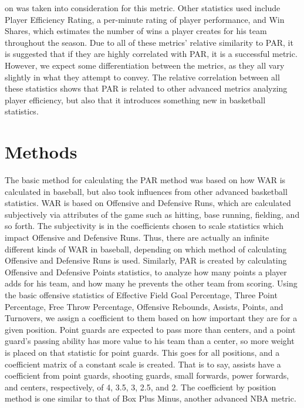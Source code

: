 \documentclass[12pt]{article}
\begin{document}
on was taken into consideration for this metric. Other statistics used include Player Efficiency Rating, a 
per-minute 
rating of player performance, and Win Shares, which estimates the number of wins a player creates 
for his team throughout the season. Due to all of these metrics' relative similarity to PAR, it is suggested 
that if they are highly correlated with PAR, it is a successful metric. However, we expect some differentiation 
between the metrics, as they all vary slightly in what they attempt to convey. The relative correlation 
between all these statistics shows that PAR is related to other advanced metrics analyzing player efficiency, 
but also that it introduces something new in basketball statistics.



\section{Methods}
The basic method for calculating the PAR method was based on how WAR is calculated in baseball, but 
also took influences from other advanced basketball statistics. WAR is based on Offensive and Defensive 
Runs, which are calculated subjectively via attributes of the game such as hitting, base running, fielding, 
and so forth. The subjectivity is in the coefficients chosen to scale statistics which impact Offensive and 
Defensive Runs. Thus, there are actually an infinite different kinds of WAR in baseball, depending on which 
method of calculating Offensive and Defensive Runs is used. Similarly, PAR is created by calculating 
Offensive and Defensive Points statistics, to analyze how many points a player adds for his team, and how 
many he prevents the other team from scoring. Using the basic offensive statistics of Effective Field Goal 
Percentage, Three Point Percentage, Free Throw Percentage, Offensive Rebounds, Assists, Points, and 
Turnovers, we assign a coefficient to them based on how important they are for a given position. Point 
guards are expected to pass more than centers, and a point guard's passing ability has more value to his 
team than a center, so more weight is placed on that statistic for point guards. This goes for all positions, 
and a coefficient matrix of a constant scale is created. That is to say, assists have a coefficient from point 
guards, shooting guards, small forwards, power forwards, and centers, respectively, of 4, 3.5, 3, 2.5, and 2. 
The coefficient by position method is one similar to that of Box Plus Minus, another advanced NBA metric. 
\end{document}
